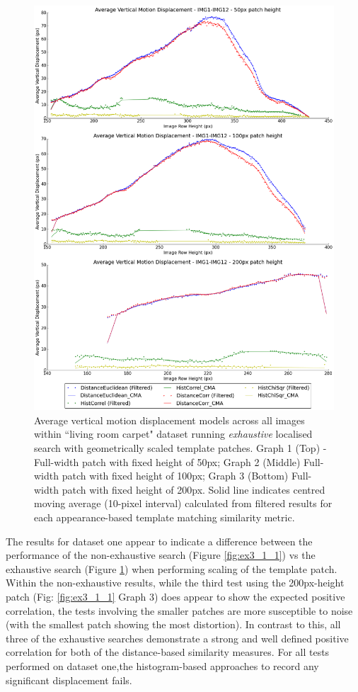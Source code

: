 \clearpage
\begin{figure}[ht!]
\centering
\includegraphics[scale=0.3]{images/results/flat_10cm_scaled_exhaustive}
\caption{Average vertical motion displacement models across all images within ``living room carpet" dataset running \textit{exhaustive} localised search with geometrically scaled template patches. Graph 1 (Top) - Full-width patch with fixed height of 50px; Graph 2 (Middle) Full-width patch with fixed height of 100px; Graph 3 (Bottom) Full-width patch with fixed height of 200px. Solid line indicates centred moving average (10-pixel interval) calculated from filtered results for each appearance-based template matching similarity metric.}
\label{fig:ex3_1_2}
\end{figure}

The results for dataset one appear to indicate a difference between the performance of the non-exhaustive search (Figure \ref{fig:ex3_1_1}) vs the exhaustive search (Figure \ref{fig:ex3_1_2}) when performing scaling of the template patch. Within the non-exhaustive results, while the third test using the 200px-height patch (Fig: \ref{fig:ex3_1_1} Graph 3) does appear to show the expected positive correlation, the tests involving the smaller patches are more susceptible to noise (with the smallest patch showing the most distortion). In contrast to this, all three of the exhaustive searches demonstrate a strong and well defined positive correlation for both of the distance-based similarity measures. For all tests performed on dataset one,the histogram-based approaches to record any significant displacement fails.

